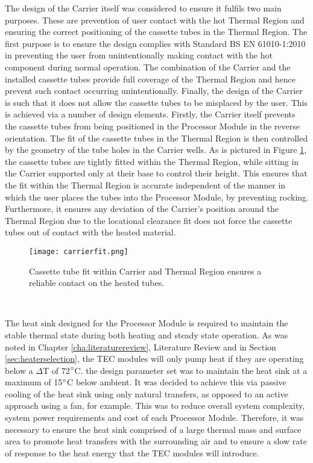 The design of the Carrier itself was considered to ensure it fulfils two main purposes. These are prevention of user contact with the hot Thermal Region and ensuring the correct positioning of the cassette tubes in the Thermal Region. The first purpose is to ensure the design complies with Standard BS EN 61010-1:2010 \cite{BSI} in preventing the user from unintentionally making contact with the hot component during normal operation. The combination of the Carrier and the installed cassette tubes provide full coverage of the Thermal Region and hence prevent such contact occurring unintentionally. Finally, the design of the Carrier is such that it does not allow the cassette tubes to be misplaced by the user. This is achieved via a number of design elements. Firstly, the Carrier itself prevents the cassette tubes from being positioned in the Processor Module in the reverse orientation. The fit of the cassette tubes in the Thermal Region is then controlled by the geometry of the tube holes in the Carrier wells. As is pictured in Figure \ref{fig:carrierfit}, the cassette tubes are tightly fitted within the Thermal Region, while sitting in the Carrier supported only at their base to control their height. This ensures that the fit within the Thermal Region is accurate independent of the manner in which the user places the tubes into the Processor Module, by preventing rocking. Furthermore, it ensures any deviation of the Carrier's position around the Thermal Region due to the locational clearance fit does not force the cassette tubes out of contact with the heated material.

\begin{figure}[!htb]
	\centering
	\texttt{[image: carrierfit.png]}
	\caption[Cassette tube fit within Carrier and Thermal Region.]{Cassette tube fit within Carrier and Thermal Region ensures a reliable contact on the heated tubes.}
	\label{fig:carrierfit}
\end{figure} 
\FloatBarrier

The heat sink designed for the Processor Module is required to maintain the stable thermal state during both heating and steady state operation. As was noted in Chapter \ref{cha:literaturereview}, Literature Review and in Section \ref{sec:heaterselection}, the TEC modules will only pump heat if they are operating below a $\Delta$T of 72$\degree$C. the design parameter set was to maintain the heat sink at a maximum of 15$\degree$C below ambient. It was decided to achieve this via passive cooling of the heat sink using only natural transfers, as opposed to an active approach using a fan, for example. This was to reduce overall system complexity, system power requirements and cost of each Processor Module. Therefore, it was necessary to ensure the heat sink comprised of a large thermal mass and surface area to promote heat transfers with the surrounding air and to ensure a slow rate of response to the heat energy that the TEC modules will introduce.\\

